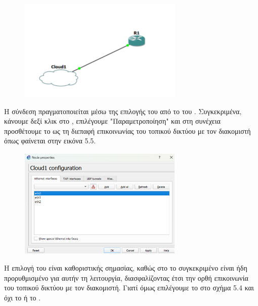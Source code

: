 \FloatBarrier

\begin{figure}[htb]
	\centering
	\includegraphics[width=0.7\textwidth]{graphics/CISCO_CLOUD.png}
	\caption{ }
\end{figure}

\FloatBarrier

\noindent Η σύνδεση πραγματοποιείται μέσω της επιλογής του  από το  του . Συγκεκριμένα, κάνουμε δεξί κλικ στο , επιλέγουμε "Παραμετροποίηση" και στη συνέχεια προσθέτουμε το  ως τη διεπαφή επικοινωνίας του τοπικού δικτύου με τον διακομιστή όπως φαίνεται στην εικόνα 5.5.

\FloatBarrier

\begin{figure}[htb]
	\centering
	\includegraphics[width=0.7\textwidth]{graphics/CLOUD_NODE_CONFIGURATION.png}
	\caption{ }
\end{figure}

\FloatBarrier


\noindent Η επιλογή του  είναι καθοριστικής σημασίας, καθώς στο  το συγκεκριμένο  είναι ήδη προρυθμισμένο για αυτήν τη λειτουργία, διασφαλίζοντας έτσι την ορθή επικοινωνία του τοπικού δικτύου με τον διακομιστή. Γιατί όμως επιλέγουμε το  στο σχήμα 5.4 και όχι το  ή το .

